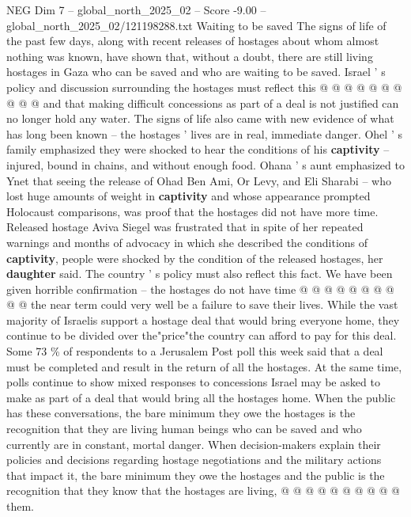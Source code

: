 \begin{textsample}{NEG Dim 7 – global\_north\_2025\_02 – Score -9.00 – global\_north\_2025\_02/121198288.txt}
Waiting to be saved The signs of life of the past few days, along with recent releases of hostages about whom almost nothing was known, have shown that, without a doubt, there are still living hostages in Gaza who can be saved and who are waiting to be saved.
Israel ' s policy and discussion surrounding the hostages must reflect this @ @ @ @ @ @ @ @ @ @ and that making difficult concessions as part of a deal is not justified can no longer hold any water.
The signs of life also came with new evidence of what has long been known -- the hostages ' lives are in real, immediate danger.
Ohel ' s family emphasized they were shocked to hear the conditions of his \textbf{captivity} -- injured, bound in chains, and without enough food.
Ohana ' s aunt emphasized to Ynet that seeing the release of Ohad Ben Ami, Or Levy, and Eli Sharabi -- who lost huge amounts of weight in \textbf{captivity} and whose appearance prompted Holocaust comparisons, was proof that the hostages did not have more time.
Released hostage Aviva Siegel was frustrated that in spite of her repeated warnings and months of advocacy in which she described the conditions of \textbf{captivity}, people were shocked by the condition of the released hostages, her \textbf{daughter} said.
The country ' s policy must also reflect this fact.
We have been given horrible confirmation -- the hostages do not have time @ @ @ @ @ @ @ @ @ @ the near term could very well be a failure to save their lives.
While the vast majority of Israelis support a hostage deal that would bring everyone home, they continue to be divided over the"price"the country can afford to pay for this deal.
Some 73 \% of respondents to a Jerusalem Post poll this week said that a deal must be completed and result in the return of all the hostages.
At the same time, polls continue to show mixed responses to concessions Israel may be asked to make as part of a deal that would bring all the hostages home.
When the public has these conversations, the bare minimum they owe the hostages is the recognition that they are living human beings who can be saved and who currently are in constant, mortal danger.
When decision-makers explain their policies and decisions regarding hostage negotiations and the military actions that impact it, the bare minimum they owe the hostages and the public is the recognition that they know that the hostages are living, @ @ @ @ @ @ @ @ @ @ them.

\end{textsample}
